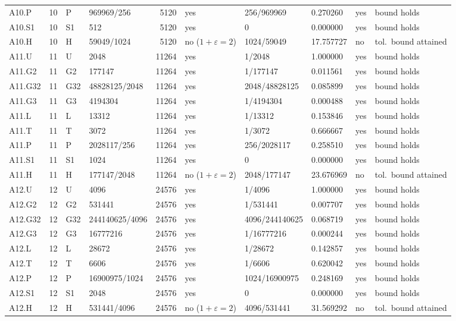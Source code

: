 {\begin{longtable}{@{}llllrlllll@{}}
A10.P & 10 & P & 969969/256 & 5120 & yes & 256/969969 & 0.270260 & yes & bound holds \\
A10.S1 & 10 & S1 & 512 & 5120 & yes & 0 & 0.000000 & yes & bound holds \\
A10.H & 10 & H & 59049/1024 & 5120 & no ($1{+}\varepsilon=2$) & 1024/59049 & 17.757727 & no & tol.\ bound attained \\
A11.U & 11 & U & 2048 & 11264 & yes & 1/2048 & 1.000000 & yes & bound holds \\
A11.G2 & 11 & G2 & 177147 & 11264 & yes & 1/177147 & 0.011561 & yes & bound holds \\
A11.G32 & 11 & G32 & 48828125/2048 & 11264 & yes & 2048/48828125 & 0.085899 & yes & bound holds \\
A11.G3 & 11 & G3 & 4194304 & 11264 & yes & 1/4194304 & 0.000488 & yes & bound holds \\
A11.L & 11 & L & 13312 & 11264 & yes & 1/13312 & 0.153846 & yes & bound holds \\
A11.T & 11 & T & 3072 & 11264 & yes & 1/3072 & 0.666667 & yes & bound holds \\
A11.P & 11 & P & 2028117/256 & 11264 & yes & 256/2028117 & 0.258510 & yes & bound holds \\
A11.S1 & 11 & S1 & 1024 & 11264 & yes & 0 & 0.000000 & yes & bound holds \\
A11.H & 11 & H & 177147/2048 & 11264 & no ($1{+}\varepsilon=2$) & 2048/177147 & 23.676969 & no & tol.\ bound attained \\
A12.U & 12 & U & 4096 & 24576 & yes & 1/4096 & 1.000000 & yes & bound holds \\
A12.G2 & 12 & G2 & 531441 & 24576 & yes & 1/531441 & 0.007707 & yes & bound holds \\
A12.G32 & 12 & G32 & 244140625/4096 & 24576 & yes & 4096/244140625 & 0.068719 & yes & bound holds \\
A12.G3 & 12 & G3 & 16777216 & 24576 & yes & 1/16777216 & 0.000244 & yes & bound holds \\
A12.L & 12 & L & 28672 & 24576 & yes & 1/28672 & 0.142857 & yes & bound holds \\
A12.T & 12 & T & 6606 & 24576 & yes & 1/6606 & 0.620042 & yes & bound holds \\
A12.P & 12 & P & 16900975/1024 & 24576 & yes & 1024/16900975 & 0.248169 & yes & bound holds \\
A12.S1 & 12 & S1 & 2048 & 24576 & yes & 0 & 0.000000 & yes & bound holds \\
A12.H & 12 & H & 531441/4096 & 24576 & no ($1{+}\varepsilon=2$) & 4096/531441 & 31.569292 & no & tol.\ bound attained \\
\end{longtable}}
